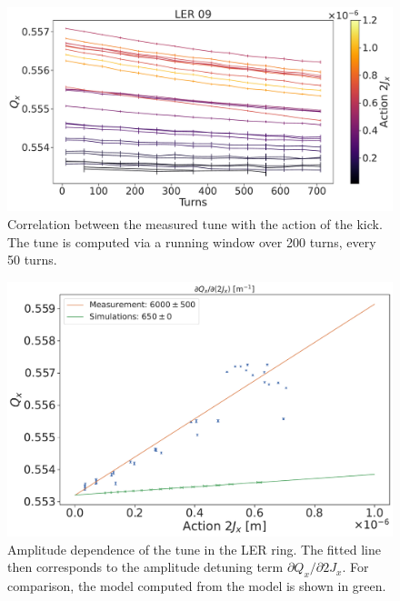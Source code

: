 \FloatBarrier
\subsubsection{}

\begin{figure}[!htb]
    \centering
    \includegraphics[width=\linewidth]{images/kek/LER_detuned_ampdet.pdf}
    \caption{Correlation between the measured tune with the action of the kick. The tune is computed
    via a running window over 200 turns, every 50 turns.}
    \label{fig:kek:ler_full_tune_ampdet}
\end{figure}



\begin{figure}[!htb]
    \centering
    \includegraphics[width=0.9\linewidth]{images/kek/amplitude_detuning.pdf}
    \caption{Amplitude dependence of the tune in the LER ring. The fitted line then corresponds to
    the amplitude detuning term $\partial Q_x/\partial 2J_x$. For comparison, the model computed 
    from the model is shown in green.}
    \label{fig:kek:ler_ampdet}
\end{figure}




